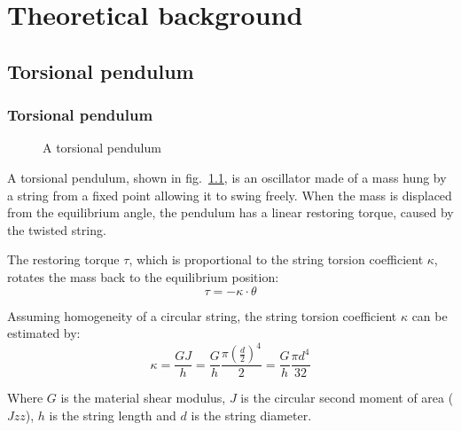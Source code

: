 \documentclass[\main/master.tex]{subfiles}
\begin{document}
\chapter{Theoretical background}\label{chapter:Theoretical background}
\section{Torsional pendulum}
\subsection{Torsional pendulum}
\begin{figure}[htbp]
	\centering
	\caption[Torsional pendulum]{A torsional pendulum}
	\label{fig:torsion_pendulum}
\end{figure}
\par\noindent
A torsional pendulum, shown in fig.~\ref{fig:torsion_pendulum}, is an oscillator made of a mass hung by a string from a fixed point allowing it to swing freely. When the mass is displaced from the equilibrium angle, the pendulum has a linear restoring torque, caused by the twisted string. 
\par\noindent
The restoring torque $\tau$, which is proportional to the string torsion coefficient $\kappa$, rotates the mass back to the equilibrium position:
\begin{equation}
\tau = -\kappa\cdot\theta     \label{eqn:hook law}
\end{equation}

\par\noindent
Assuming homogeneity of a circular string, the string torsion coefficient $\kappa$ can be estimated by:
\begin{equation}
\kappa = \frac{GJ}{h} = \frac{G}{h} \frac{\pi(\frac{d}{2})^4}{2}  = \frac{G}{h} \frac{\pi d^4}{32}   \label{eqn:torsion_coefficient_homogeneity}
\end{equation}
\par\noindent
Where $G$ is the material shear modulus, $J$ is the circular second moment of area ($Jzz$), $h$ is the string length and $d$ is the string diameter.
 
\end{document}
